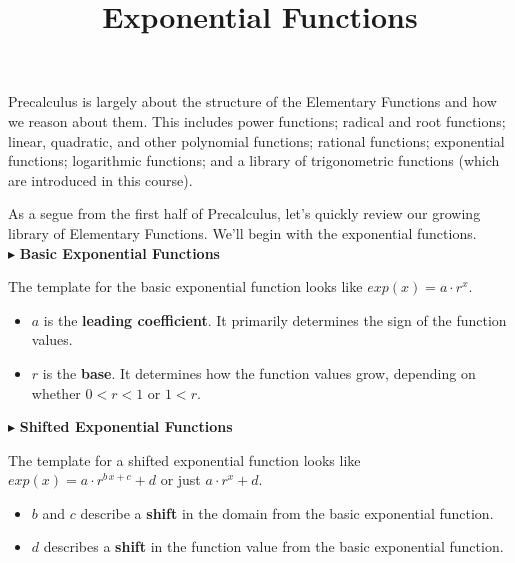 \documentclass{ximera}
\title{Exponential Functions}
\begin{document}
\begin{abstract}
\end{abstract}
\maketitle




Precalculus is largely about the structure of the Elementary Functions and how we reason about them.  This includes power functions; radical and root functions; linear, quadratic, and other polynomial functions; rational functions; exponential functions; logarithmic functions; and a library of trigonometric functions (which are introduced in this course).

As a segue from the first half of Precalculus, let's quickly review our growing library of Elementary Functions. We'll begin with the exponential functions.   \\





$\blacktriangleright$ \textbf{\textcolor{blue!55!black}{Basic Exponential Functions}} 


The template for the basic exponential function looks like \textbf{\textcolor{blue!55!black}{$exp(x) = a \cdot r^x$}}. 

\begin{itemize}
\item $a$ is the \textbf{\textcolor{purple!85!blue}{leading coefficient}}.  It primarily determines the sign of the function values.
\item $r$ is the \textbf{\textcolor{purple!85!blue}{base}}. It determines how the function values grow, depending on whether $0 < r < 1$ or $1 < r$.
\end{itemize}





$\blacktriangleright$ \textbf{\textcolor{blue!55!black}{Shifted Exponential Functions}}   

The template for a shifted exponential function looks like \textbf{\textcolor{blue!55!black}{$exp(x) = a \cdot r^{b \, x + c} + d$}}  or just \textbf{\textcolor{blue!55!black}{$a \cdot r^x + d$}}. 

\begin{itemize}
\item $b$ and $c$ describe a \textbf{\textcolor{purple!85!blue}{shift}} in the domain from the basic exponential function.  
\item $d$ describes a \textbf{\textcolor{purple!85!blue}{shift}} in the function value from the basic exponential function. 
\end{itemize}
\end{document}
